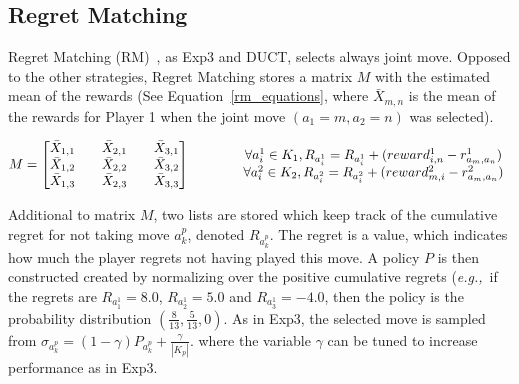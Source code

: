 \documentclass{article}
\newcommand{\eg}{{\it e.g.,}~}
\begin{document}


\subsection{Regret Matching}
\label{subsec:rm}
Regret Matching (RM)~\cite{Hart00}, as Exp3 and DUCT, selects always joint move. Opposed to the other strategies, Regret Matching stores a matrix $M$ with the estimated mean of the rewards (See Equation~\ref{rm_equations}, where $\bar{X}_{m,n}$ is the mean of the rewards for Player 1 when the joint move $(a_{1}=m,a_{2}=n)$ was selected).

\begin{equation}
\label{rm_equations}
M = 
\begin{bmatrix}
\bar{X}_{1,1} && \bar{X}_{2,1} && \bar{X}_{3,1} \\
\bar{X}_{1,2} && \bar{X}_{2,2} && \bar{X}_{3,2} \\
\bar{X}_{1,3} && \bar{X}_{2,3} && \bar{X}_{3,3}
\end{bmatrix}
\mbox{ \hspace{1cm} }
\begin{array}{c}
\forall a^{1}_{i} \in K_{1}, R_{a^{1}_{i}} = R_{a^{1}_{i}} + (reward^1_{i,n} - r^{1}_{a_{m},a_{n}})\\
\forall a^{2}_{i} \in K_{2}, R_{a^{2}_{i}} = R_{a^{2}_{i}} + (reward^2_{m,i} - r^{2}_{a_{m},a_{n}})
\end{array}
\end{equation}

Additional to matrix $M$, two lists are stored which keep track of the cumulative regret for not taking move $a^p_k$, denoted $R_{a^{p}_{k}}$.
The regret is a value, which indicates how much the player regrets not having played this move. 
A policy $P$ is then constructed created by normalizing over the positive cumulative regrets (\eg if the regrets are $R_{a^{1}_{1}} = 8.0$, $R_{a^{1}_{2}} = 5.0$ and $R_{a^{1}_{3}} = -4.0$, then the policy is the probability distribution $(\frac{8}{13}, \frac{5}{13}, 0)$. 
As in Exp3, the selected move is sampled from $\sigma_{a^{p}_{k}}=(1-\gamma) P_{a^{p}_{k}} + \frac{\gamma}{|K_{p}|}$. 
where the variable $\gamma$ can be tuned to increase performance as in Exp3.

\end{document}
